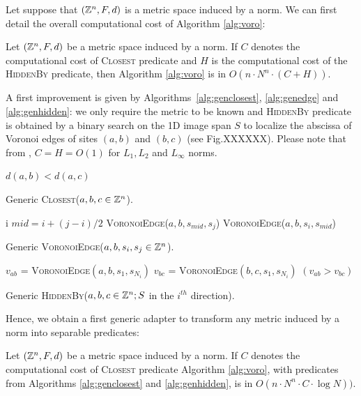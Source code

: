\documentclass{llncs}
\begin{document}
Let suppose that $({\mathbb{Z}}^n,F,d)$ is a metric space induced by a norm. We
can first detail the overall computational cost of Algorithm
\ref{alg:voro}:
\begin{lemma}
\label{lem:generic}
   Let $({\mathbb{Z}}^n, F, d)$ be a metric space induced by a norm. If $C$
  denotes the computational cost of \textsc{Closest} predicate and $H$
  is the computational cost of the \textsc{HiddenBy} predicate, then
  Algorithm \ref{alg:voro} is in   $O(n\cdot N^n\cdot (C+H))$.
\end{lemma}
A first improvement is given by Algorithms~\ref{alg:genclosest},
\ref{alg:genedge} and \ref{alg:genhidden}: we only require the metric
to be known and \textsc{HiddenBy} predicate is obtained by a binary
search on the 1D image span $S$ to localize the abscissa of Voronoi
edges of sites $(a,b)$ and $(b,c)$ (see Fig.XXXXXX). Please note that
from \cite{Breu1995,roerdnik}, $C=H=O(1)$ for $L_1,L_2$ and $L_\infty$
norms.



\begin{algorithm}[H]\footnotesize
  \Return $d(a,b) < d(a,c)$\;
  \caption{Generic \textsc{Closest}($a,b,c\in{\mathbb{Z}}^n$).\label{alg:genclosest}}
\end{algorithm}


\begin{algorithm}[H]\footnotesize
     {
       \Return  i
     }
     $mid  = i + (j-i)/2$\;
       {
         \Return \textsc{VoronoiEdge}($a,b,s_{mid},s_j$)
}
 {
         \Return \textsc{VoronoiEdge}($a,b,s_{i},s_{mid}$)
}

  \caption{Generic \textsc{VoronoiEdge}($a,b,s_i,s_j\in{\mathbb{Z}}^n$).\label{alg:genedge}}
\end{algorithm}

\begin{algorithm}[H]\footnotesize
  $v_{ab}$ = \textsc{VoronoiEdge}$(a,b,s_1, s_{N_i})$\;
  $v_{bc}$ = \textsc{VoronoiEdge}$(b,c,s_1, s_{N_i})$\;
  \Return $(v_{ab}> v_{bc})$\;
  \caption{Generic \textsc{HiddenBy}($a,b,c\in{\mathbb{Z}}^n; S$ in the $i^{th}$
    direction).\label{alg:genhidden}}
\end{algorithm}

Hence, we obtain a first generic adapter to transform any metric
induced by a norm into separable predicates:

\begin{lemma}
\label{lem:generic}
   Let $({\mathbb{Z}}^n, F, d)$ be a metric space induced by a norm. If $C$
   denotes the computational cost of \textsc{Closest} predicate
   Algorithm \ref{alg:voro},  with predicates from Algorithms
   \ref{alg:genclosest} and \ref{alg:genhidden}, is in $O(n\cdot N^n\cdot C\cdot \log{N}))$.
\end{lemma}
\end{document}

